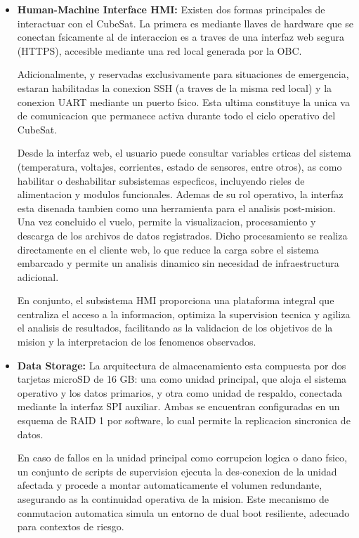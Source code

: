 \begin{itemize}
      \item \textbf{Human-Machine Interface HMI:} Existen dos formas principales de interactuar con
        el CubeSat. La primera es mediante llaves de hardware que se conectan fsicamente al
        de interaccion es a traves de una interfaz web segura (HTTPS), accesible mediante una
        red local generada por la OBC.

        Adicionalmente, y reservadas exclusivamente para situaciones de emergencia, estaran
        habilitadas la conexion SSH (a traves de la misma red local) y la conexion UART
        mediante un puerto fsico. Esta ultima constituye la unica va de comunicacion que
        permanece activa durante todo el ciclo operativo del CubeSat.

        Desde la interfaz web, el usuario puede consultar variables crticas del sistema (temperatura, voltajes,
        corrientes, estado de sensores, entre otros), as como habilitar o
        deshabilitar subsistemas especficos, incluyendo rieles de alimentacion y modulos funcionales.
        Ademas de su rol operativo, la interfaz esta disenada tambien como una herramienta
        para el analisis post-mision. Una vez concluido el vuelo, permite la visualizacion, procesamiento
        y descarga de los archivos de datos registrados. Dicho procesamiento se realiza
        directamente en el cliente web, lo que reduce la carga sobre el sistema embarcado y
        permite un analisis dinamico sin necesidad de infraestructura adicional.

        En conjunto, el subsistema HMI proporciona una plataforma integral que centraliza el
        acceso a la informacion, optimiza la supervision tecnica y agiliza el analisis de resultados,
        facilitando as la validacion de los objetivos de la mision y la interpretacion de los
        fenomenos observados.

      \item \textbf{Data Storage:} La arquitectura de almacenamiento esta compuesta por dos tarjetas
        microSD de 16 GB: una como unidad principal, que aloja el sistema operativo y los
        datos primarios, y otra como unidad de respaldo, conectada mediante la interfaz SPI
        auxiliar. Ambas se encuentran configuradas en un esquema de RAID 1 por software,
        lo cual permite la replicacion sincronica de datos.

        En caso de fallos en la unidad principal
        como corrupcion logica o dano fsico, un conjunto de scripts de supervision ejecuta
        la des-conexion de la unidad afectada y procede a montar automaticamente el volumen
        redundante, asegurando as la continuidad operativa de la mision. Este mecanismo de
        conmutacion automatica simula un entorno de dual boot resiliente, adecuado para
        contextos de riesgo.


\end{itemize}
